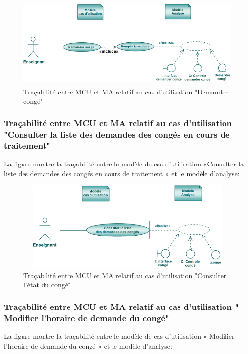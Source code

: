 \documentclass[12 pt]{report}
\begin{document}
\begin{figure}[h]
\begin{center}
\includegraphics[width= 14cm , height =4.5cm]{tdcc.PNG}
\caption{Traçabilité entre MCU et MA relatif au cas d’utilisation "Demander congé"}
\end{center}
\end{figure}
\subsubsection{Traçabilité entre MCU et MA relatif au cas d’utilisation "Consulter la liste des demandes des congés en cours de traitement" }
La figure  montre la traçabilité entre le modèle de cas d’utilisation «Consulter la liste des demandes des congés en cours de traitement » et le modèle d’analyse:

\begin{figure}[h]
\begin{center}
\includegraphics[width= 14cm , height =4.5cm]{tcc.PNG}
\caption{Traçabilité entre MCU et MA relatif au cas d’utilisation "Consulter l'état du congé"}
\end{center}
\end{figure}
\subsubsection{Traçabilité entre MCU et MA relatif au cas d’utilisation " Modifier l'horaire de demande du congé" }
La figure  montre la traçabilité entre le modèle de cas d’utilisation « Modifier l'horaire de demande du congé » et le modèle d’analyse:
\end{document}
